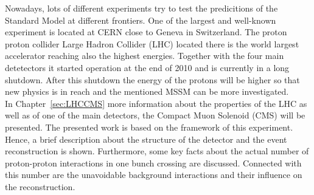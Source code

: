 Nowadays, lots of different experiments try to test the predicitions of the Standard Model at different frontiers. One of the largest and well-known experiment is located at CERN  close to Geneva in Switzerland. The proton proton collider Large Hadron Collider (LHC) located there is the world largest accelerator reaching also the highest energies. Together with the four main detetectors it started operation at the end of 2010 and is currently in a long shutdown. After this shutdown the energy of the protons will be higher so that new physics is in reach and the mentioned MSSM can be more investigated. \\

In Chapter~\ref{sec:LHCCMS} more information about the properties of the LHC as well as of one of the main detectors, the Compact Muon Solenoid (CMS) will be presented. The presented work is based on the framework of this experiment. Hence, a brief description about the structure of the detector and the event reconstruction is shown. Furthermore, some key facts about the actual number of proton-proton interactions in one bunch crossing are discussed. Connected with this number are the unavoidable background interactions and their influence on the reconstruction. 
